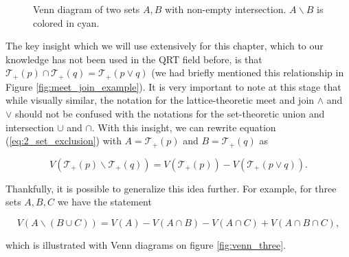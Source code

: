 \begin{figure}[h!] %
    \centering
    \caption{Venn diagram of two sets $A, B$ with non-empty intersection. $A \backslash B$ is colored in cyan.}
    \label{fig:venn_two}
\end{figure}

The key insight which we will use extensively for this chapter, which to our knowledge has not been used in the QRT field before, is that $\mathcal{T}_+(p) \cap \mathcal{T}_+(q) = \mathcal{T}_+(p \vee q)$ (we had briefly mentioned this relationship in Figure \ref{fig:meet_join_example}). It is very important to note at this stage that while visually similar, the notation for the lattice-theoretic meet and join $\wedge$ and $\vee$ should not be confused with the notations for the set-theoretic union and intersection $\cup$ and $\cap$. With this insight, we can rewrite equation (\ref{eq:2_set_exclusion}) with $A = \mathcal{T}_+(p)$ and $B = \mathcal{T}_+(q)$ as

\begin{equation}
    V(\mathcal{T}_+(p) \backslash \mathcal{T}_+(q)) = V(\mathcal{T}_+(p)) - V(\mathcal{T}_+(p \vee q)).
\end{equation}

Thankfully, it is possible to generalize this idea further. For example, for three sets $A, B, C$ we have the statement

\begin{equation}
    V(A \backslash (B \cup C)) = V(A) - V(A \cap B) - V(A \cap C) + V(A \cap B \cap C),
\end{equation}

\noindent which is illustrated with Venn diagrams on figure \ref{fig:venn_three}.

